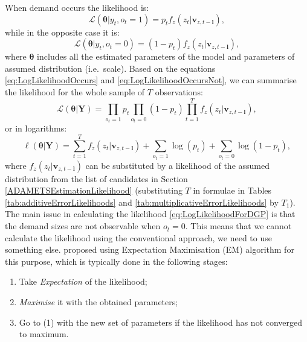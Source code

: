 \documentclass[
]{book}
\providecommand{\tightlist}{%
  \setlength{\itemsep}{0pt}\setlength{\parskip}{0pt}}
\theoremstyle{definition}
\theoremstyle{definition}
\theoremstyle{definition}
\theoremstyle{definition}
\theoremstyle{remark}
\begin{document}
When demand occurs the likelihood is:
\begin{equation}
    \mathcal{L}(\boldsymbol{\theta} | y_t, o_t=1) = p_t f_z(z_t | \mathbf{v}_{z,t-\boldsymbol{l}}) ,
    \label{eq:LogLikelihoodOccurs}
\end{equation}
while in the opposite case it is:
\begin{equation}
    \mathcal{L}(\boldsymbol{\theta} | y_t, o_t=0) = (1-p_t) f_z(z_t | \mathbf{v}_{z,t-\boldsymbol{l}}),
    \label{eq:LogLikelihoodOccursNot}
\end{equation}
where \(\boldsymbol{\theta}\) includes all the estimated parameters of the model and parameters of assumed distribution (i.e.~scale). Based on the equations \eqref{eq:LogLikelihoodOccurs} and \eqref{eq:LogLikelihoodOccursNot}, we can summarise the likelihood for the whole sample of \(T\) observations:
\begin{equation}
    \mathcal{L}(\boldsymbol{\theta} | \textbf{Y}) = \prod_{o_t=1} p_t \prod_{o_t=0} (1-p_t) \prod_{t=1}^T f_z(z_t | \mathbf{v}_{z,t-\boldsymbol{l}}) ,
    \label{eq:LikelihoodForDGP}
\end{equation}
or in logarithms:
\begin{equation}
    \ell(\boldsymbol{\theta} | \textbf{Y}) = \sum_{t=1}^T f_z(z_t | \mathbf{v}_{z,t-\boldsymbol{l}}) + \sum_{o_t=1} \log(p_t) + \sum_{o_t=0} \log(1-p_t),
    \label{eq:LogLikelihoodForDGP}
\end{equation}
where \(f_z(z_t | \mathbf{v}_{z,t-\boldsymbol{l}})\) can be substituted by a likelihood of the assumed distribution from the list of candidates in Section \ref{ADAMETSEstimationLikelihood} (substituting \(T\) in formulae in Tables \ref{tab:additiveErrorLikelihoods} and \ref{tab:multiplicativeErrorLikelihoods} by \(T_1\)). The main issue in calculating the likelihood \eqref{eq:LogLikelihoodForDGP} is that the demand sizes are not observable when \(o_t=0\). This means that we cannot calculate the likelihood using the conventional approach, we need to use something else. \citet{Svetunkov2019a} proposed using Expectation Maximisation (EM) algorithm for this purpose, which is typically done in the following stages:

\begin{enumerate}
\def\labelenumi{\arabic{enumi}.}
\tightlist
\item
  Take \emph{Expectation} of the likelihood;
\item
  \emph{Maximise} it with the obtained parameters;
\item
  Go to (1) with the new set of parameters if the likelihood has not converged to maximum.
\end{enumerate}
\end{document}
